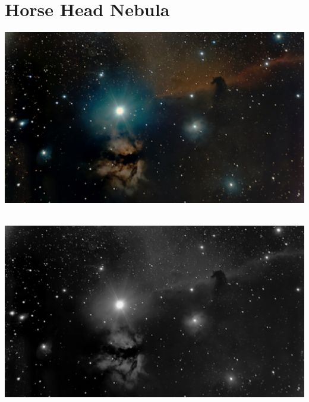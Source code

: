 \ \\\section{Horse Head Nebula}
\includegraphics[width=\textwidth]{../Imaging//Original/Horse_Head_Nebula.jpg}
{\footnotesize\color{white}


}\ \\
\includegraphics[width=\textwidth]{../Imaging//Grayscale/Horse_Head_Nebula.jpg}
